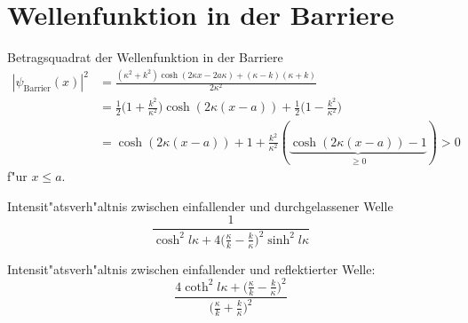 \section{Wellenfunktion in der Barriere}
Betragsquadrat der Wellenfunktion in der Barriere
\begin{align*}
|\psi_{\text{Barrier}}(x)|^2
&=
\frac{
(\kappa^2+k^2)\cosh (2\kappa x-2a\kappa)+(\kappa-k)(\kappa+k)
}{
2\kappa ^2
}
\\
&=
\frac12
\biggl(1+\frac{k^2}{\kappa^2}\biggr)
\cosh (2\kappa(x-a))
+
\frac12
\biggl(1-\frac{k^2}{\kappa^2}\biggr)
\\
&=
\cosh (2\kappa(x-a))+1
+
\frac{k^2}{\kappa^2}
(\underbrace{\cosh (2\kappa(x-a))-1}_{\ge 0})
>0
\end{align*}
f"ur $x\le a$.

Intensit"atsverh"altnis zwischen einfallender und durchgelassener
Welle
\[
\frac{1}{
\displaystyle
\cosh^2 l\kappa 
+
4\biggl(\displaystyle\frac{\kappa}{k}-\frac{k}{\kappa}\biggr)^2\sinh^2l\kappa
}
\]

Intensit"atsverh"altnis zwischen einfallender und reflektierter
Welle:
\[
\frac{
4\coth^2l\kappa + \biggl(\displaystyle\frac{\kappa}{k}-\frac{k}{\kappa}\biggr)^2
}{
\biggl(\displaystyle\frac{\kappa}{k}+\frac{k}{\kappa}\biggr)^2
}
\]

